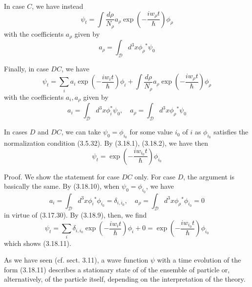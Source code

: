 \documentclass{article}
\begin{document}
In case $C$, we have instead
$$
\begin{equation*}
\psi_{t}=\int \frac{d \rho}{N_{\rho}} a_{\rho} \exp \left(-\frac{i w_{\rho} t}{\hbar}\right) \phi_{\rho} \tag{3.18.7}
\end{equation*}
$$
with the coefficients $a_{\rho}$ given by
$$
\begin{equation*}
a_{\rho}=\int_{\mathcal{D}} d^{3} x \phi_{\rho}{ }^{*} \psi_{0} \tag{3.18.8}
\end{equation*}
$$

Finally, in case $D C$, we have
$$
\begin{equation*}
\psi_{t}=\sum_{i} a_{i} \exp \left(-\frac{i w_{i} t}{\hbar}\right) \phi_{i}+\int \frac{d \rho}{N_{\rho}} a_{\rho} \exp \left(-\frac{i w_{\rho} t}{\hbar}\right) \phi_{\rho} \tag{3.18.9}
\end{equation*}
$$
with the coefficients $a_{i}, a_{\rho}$ given by
$$
\begin{equation*}
a_{i}=\int_{\mathcal{D}} d^{3} x \phi_{i}^{*} \psi_{0}, \quad a_{\rho}=\int_{\mathcal{D}} d^{3} x \phi_{\rho}{ }^{*} \psi_{0} \tag{3.18.10}
\end{equation*}
$$

In cases $D$ and $D C$, we can take $\psi_{0}=\phi_{i_{0}}$ for some value $i_{0}$ of $i$ as $\phi_{i_{0}}$ satisfies the normalization condition (3.5.32). By (3.18.1), (3.18.2), we have then
$$
\begin{equation*}
\psi_{t}=\exp \left(-\frac{i w_{i_{0}} t}{\hbar}\right) \phi_{i_{0}} \tag{3.18.11}
\end{equation*}
$$

Proof. We show the statement for case $D C$ only. For case $D$, the argument is basically the same. By (3.18.10), when $\psi_{0}=\phi_{i_{0}}$, we have
$$
\begin{equation*}
a_{i}=\int_{\mathcal{D}} d^{3} x \phi_{i}{ }^{*} \phi_{i_{0}}=\delta_{i, i_{0}}, \quad a_{\rho}=\int_{\mathcal{D}} d^{3} x \phi_{\rho}{ }^{*} \phi_{i_{0}}=0 \tag{3.18.12}
\end{equation*}
$$
in virtue of (3.17.30). By (3.18.9), then, we find
$$
\begin{equation*}
\psi_{t}=\sum_{i} \delta_{i, i_{0}} \exp \left(-\frac{i w_{i} t}{\hbar}\right) \phi_{i}+0=\exp \left(-\frac{i w_{i_{0}} t}{\hbar}\right) \phi_{i_{0}} \tag{3.18.13}
\end{equation*}
$$
which shows (3.18.11).

As we have seen (cf. sect. 3.11), a wave function $\psi$ with a time evolution of the form (3.18.11) describes a stationary state of of the ensemble of particle or, alternatively, of the particle itself, depending on the interpretation of the theory.
\end{document}
